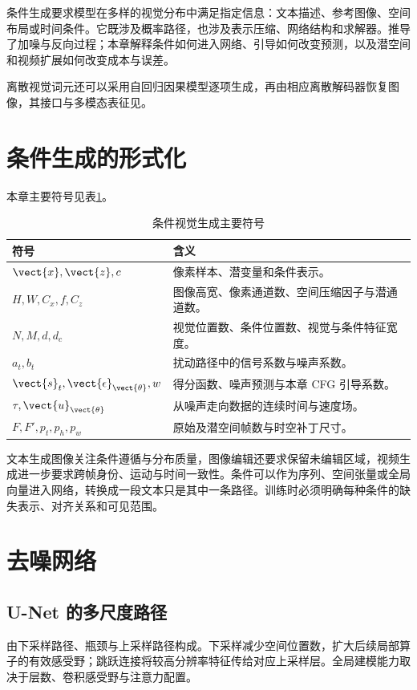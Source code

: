 \documentclass[../textbook.tex]{subfiles}
\begin{document}
\fi
{}

条件生成要求模型在多样的视觉分布中满足指定信息：文本描述、参考图像、空间布局或时间条件。它既涉及概率路径，也涉及表示压缩、网络结构和求解器。推导了加噪与反向过程；本章解释条件如何进入网络、引导如何改变预测，以及潜空间和视频扩展如何改变成本与误差。

离散视觉词元还可以采用自回归因果模型逐项生成，再由相应离散解码器恢复图像，其接口与多模态表征见。

\section{条件生成的形式化}

本章主要符号见表\ref{tab:conditional-vision-symbols}。
\begin{table}[htbp]
\centering
\caption{条件视觉生成主要符号}\label{tab:conditional-vision-symbols}
\begin{tabular}{ll}
\toprule
符号 & 含义\\
\midrule
$\vect{x},\vect{z},c$ & 像素样本、潜变量和条件表示。\\
$H,W,C_x,f,C_z$ & 图像高宽、像素通道数、空间压缩因子与潜通道数。\\
$N,M,d,d_c$ & 视觉位置数、条件位置数、视觉与条件特征宽度。\\
$a_t,b_t$ & 扰动路径中的信号系数与噪声系数。\\
$\vect{s}_t,\vect{\epsilon}_{\vect{\theta}},w$ & 得分函数、噪声预测与本章 CFG 引导系数。\\
$\tau,\vect{u}_{\vect{\theta}}$ & 从噪声走向数据的连续时间与速度场。\\
$F,F',p_t,p_h,p_w$ & 原始及潜空间帧数与时空补丁尺寸。\\
\bottomrule
\end{tabular}
\end{table}

文本生成图像关注条件遵循与分布质量，图像编辑还要求保留未编辑区域，视频生成进一步要求跨帧身份、运动与时间一致性。条件可以作为序列、空间张量或全局向量进入网络，转换成一段文本只是其中一条路径。训练时必须明确每种条件的缺失表示、对齐关系和可见范围。

\section{去噪网络}

\subsection{U-Net 的多尺度路径}
由下采样路径、瓶颈与上采样路径构成。下采样减少空间位置数，扩大后续局部算子的有效感受野；跳跃连接将较高分辨率特征传给对应上采样层。全局建模能力取决于层数、卷积感受野与注意力配置。
\end{document}
